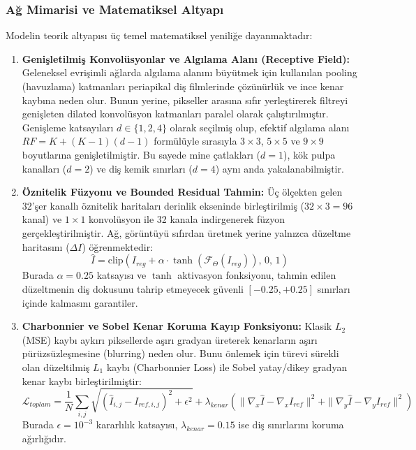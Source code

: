 \documentclass[12pt,a4paper]{article}
\begin{document}
\subsubsection{Ağ Mimarisi ve Matematiksel Altyapı}
Modelin teorik altyapısı üç temel matematiksel yeniliğe dayanmaktadır:
\begin{enumerate}
    \item \textbf{Genişletilmiş Konvolüsyonlar ve Algılama Alanı (Receptive Field):} Geleneksel evrişimli ağlarda algılama alanını büyütmek için kullanılan pooling (havuzlama) katmanları periapikal diş filmlerinde çözünürlük ve ince kenar kaybına neden olur. Bunun yerine, pikseller arasına sıfır yerleştirerek filtreyi genişleten dilated konvolüsyon katmanları paralel olarak çalıştırılmıştır. Genişleme katsayıları $d \in \{1, 2, 4\}$ olarak seçilmiş olup, efektif algılama alanı $RF = K + (K-1)(d-1)$ formülüyle sırasıyla $3\times 3$, $5\times 5$ ve $9\times 9$ boyutlarına genişletilmiştir. Bu sayede mine çatlakları ($d=1$), kök pulpa kanalları ($d=2$) ve diş kemik sınırları ($d=4$) aynı anda yakalanabilmiştir.
    \item \textbf{Öznitelik Füzyonu ve Bounded Residual Tahmin:} Üç ölçekten gelen 32'şer kanallı öznitelik haritaları derinlik ekseninde birleştirilmiş ($32 \times 3 = 96$ kanal) ve $1\times 1$ konvolüsyon ile 32 kanala indirgenerek füzyon gerçekleştirilmiştir. Ağ, görüntüyü sıfırdan üretmek yerine yalnızca düzeltme haritasını ($\Delta I$) öğrenmektedir:
    \begin{equation}
        \hat{I} = \text{clip}\left( I_{reg} + \alpha \cdot \tanh(\mathcal{F}_{\Theta}(I_{reg})), \, 0, \, 1 \right)
    \end{equation}
    Burada $\alpha = 0.25$ katsayısı ve $\tanh$ aktivasyon fonksiyonu, tahmin edilen düzeltmenin diş dokusunu tahrip etmeyecek güvenli $[-0.25, +0.25]$ sınırları içinde kalmasını garantiler.
    \item \textbf{Charbonnier ve Sobel Kenar Koruma Kayıp Fonksiyonu:} Klasik $L_2$ (MSE) kaybı aykırı piksellerde aşırı gradyan üreterek kenarların aşırı pürüzsüzleşmesine (blurring) neden olur. Bunu önlemek için türevi sürekli olan düzeltilmiş $L_1$ kaybı (Charbonnier Loss) ile Sobel yatay/dikey gradyan kenar kaybı birleştirilmiştir:
    \begin{equation}
        \mathcal{L}_{toplam} = \frac{1}{N} \sum_{i,j} \sqrt{(\hat{I}_{i,j} - I_{ref, i,j})^2 + \epsilon^2} + \lambda_{kenar} \left( \|\nabla_x \hat{I} - \nabla_x I_{ref}\|^2 + \|\nabla_y \hat{I} - \nabla_y I_{ref}\|^2 \right)
    \end{equation}
    Burada $\epsilon = 10^{-3}$ kararlılık katsayısı, $\lambda_{kenar} = 0.15$ ise diş sınırlarını koruma ağırlığıdır.
\end{enumerate}
\end{document}
